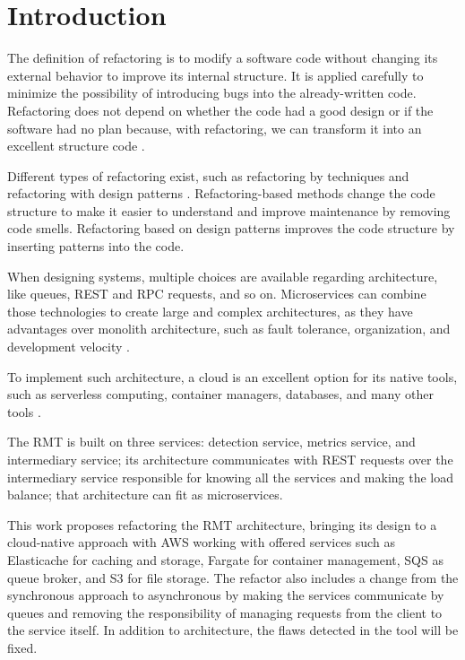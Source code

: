 \chapter{Introduction}%
\label{chpt-intro}
The definition of refactoring is to modify a software code without changing its external behavior to improve its internal structure. It is applied carefully to minimize the possibility of introducing bugs into the already-written code. Refactoring does not depend on whether the code had a good design or if the software had no plan because, with refactoring, we can transform it into an excellent structure code \cite{fowler2018refactoring}.

Different types of refactoring exist, such as refactoring by techniques \cite{fowler2018refactoring} and refactoring with design patterns \cite{kerievsky2005refactoring}. Refactoring-based methods change the code structure to make it easier to understand and improve maintenance by removing code smells. Refactoring based on design patterns improves the code structure by inserting patterns into the code.

When designing systems, multiple choices are available regarding architecture, like queues, REST and RPC requests, and so on. Microservices can combine those technologies to create large and complex architectures, as they have advantages over monolith architecture, such as fault tolerance, organization, and development velocity \cite{microservices-comuni}.

To implement such architecture, a cloud is an excellent option for its native tools, such as serverless computing, container managers, databases, and many other tools \cite{balalaie2016}.

The RMT is built on three services: detection service, metrics service, and intermediary service; its architecture communicates with REST requests over the intermediary service responsible for knowing all the services and making the load balance; that architecture can fit as microservices.

This work proposes refactoring the RMT architecture, bringing its design to a cloud-native approach with AWS working with offered services such as Elasticache for caching and storage, Fargate for container management, SQS as queue broker, and S3 for file storage. The refactor also includes a change from the synchronous approach to asynchronous by making the services communicate by queues and removing the responsibility of managing requests from the client to the service itself. In addition to architecture, the flaws detected in the tool will be fixed.

